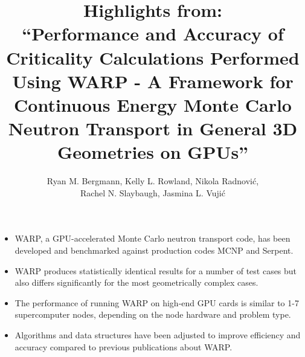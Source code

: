 \documentclass{article}
\begin{document}

\title{Highlights from:\\ ``Performance and Accuracy of Criticality Calculations Performed Using WARP - A Framework for Continuous Energy Monte Carlo Neutron Transport in General 3D Geometries on GPUs''}
\author{Ryan M. Bergmann, Kelly L. Rowland, Nikola Radnovi\'c, \\ Rachel N. Slaybaugh, Jasmina L. Vuji\'c}
\maketitle

\begin{itemize}
\item WARP, a GPU-accelerated Monte Carlo neutron transport code, has been developed and benchmarked against production codes MCNP and Serpent.
\item WARP produces statistically identical results for a number of test cases but also differs significantly for the most geometrically complex cases.
\item The performance of running WARP on high-end GPU cards is similar to 1-7 supercomputer nodes, depending on the node hardware and problem type.
\item Algorithms and data structures have been adjusted to improve efficiency and accuracy compared to previous publications about WARP.
\end{itemize}
\end{document}

